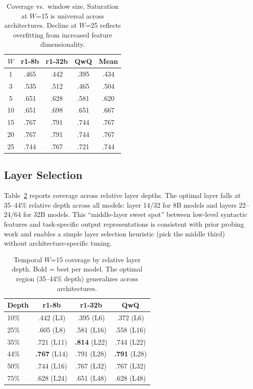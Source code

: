 \documentclass[11pt,a4paper]{article}
\begin{document}
\begin{table}[t]
\centering
\small
\begin{tabular}{ccccc}
\toprule
$W$ & \textbf{r1-8b} & \textbf{r1-32b} & \textbf{QwQ} & \textbf{Mean} \\
\midrule
1 & .465 & .442 & .395 & .434 \\
3 & .535 & .512 & .465 & .504 \\
5 & .651 & .628 & .581 & .620 \\
10 & .651 & .698 & .651 & .667 \\
15 & .767 & .791 & .744 & .767 \\
20 & .767 & .791 & .744 & .767 \\
25 & .744 & .767 & .721 & .744 \\
\bottomrule
\end{tabular}
\caption{Coverage vs.\ window size.  Saturation at $W$=15 is universal across architectures.  Decline at $W$=25 reflects overfitting from increased feature dimensionality.}
\label{tab:window}
\end{table}

\subsection{Layer Selection}
\label{sec:layer_ablation}

Table~\ref{tab:layers} reports coverage across relative layer depths.
The optimal layer falls at 35--44\% relative depth across all models: layer 14/32 for 8B models and layers 22--24/64 for 32B models.
This ``middle-layer sweet spot'' between low-level syntactic features and task-specific output representations is consistent with prior probing work and enables a simple layer selection heuristic (pick the middle third) without architecture-specific tuning.

\begin{table}[t]
\centering
\small
\begin{tabular}{lccc}
\toprule
\textbf{Depth} & \textbf{r1-8b} & \textbf{r1-32b} & \textbf{QwQ} \\
\midrule
10\% & .442 (L3) & .395 (L6) & .372 (L6) \\
25\% & .605 (L8) & .581 (L16) & .558 (L16) \\
35\% & .721 (L11) & \textbf{.814} (L22) & .744 (L22) \\
44\% & \textbf{.767} (L14) & .791 (L28) & \textbf{.791} (L28) \\
50\% & .744 (L16) & .767 (L32) & .767 (L32) \\
75\% & .628 (L24) & .651 (L48) & .628 (L48) \\
\bottomrule
\end{tabular}
\caption{Temporal $W$=15 coverage by relative layer depth.  Bold = best per model.  The optimal region (35--44\% depth) generalizes across architectures.}
\label{tab:layers}
\end{table}
\end{document}
